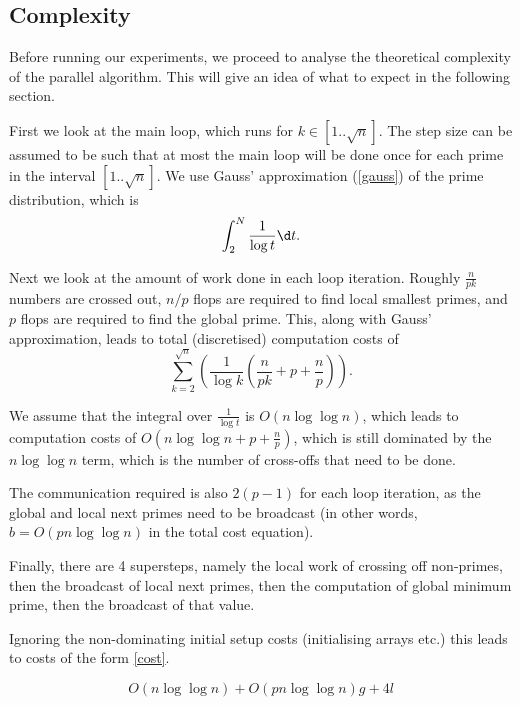 \documentclass[a4paper]{article}
\begin{document}
\subsection{Complexity}

Before running our experiments, we proceed to analyse the theoretical complexity of the parallel algorithm. 
This will give an idea of what to expect in the following section.

First we look at the main loop, which runs for $k \in [1 .. \sqrt n]$. The step
size can be assumed to be such that at most the main loop will be done once for each prime
in the interval $[1 .. \sqrt n]$. We use Gauss' approximation (\ref{gauss}) of the prime distribution, which is 
\begin{eqnarray}
    \int_2^N \frac{1}{\log t} \d t.
    \label{gauss}
\end{eqnarray}

Next we look at the amount of work done in each loop iteration. Roughly $\frac{n}{p k}$ numbers are crossed out, 
$n/p$ flops are required to find local smallest primes, and $p$ flops are required to find the global prime.
This, along with Gauss' approximation, leads to total (discretised) computation costs of 
\begin{equation}
    \sum_{k=2}^{\sqrt n} \left( \frac{1}{\log k} \left( \frac{n}{p k} + p + \frac{n}{p}\right) \right) .
\end{equation}

We assume that the integral over $\frac{1}{\log t}$ is $O(n \log \log n)$, which leads to computation costs
of $O( n \log \log n +p + \frac{n}{p})$, which is still dominated by the $n \log \log n$ term, which is the number 
of cross-offs that need to be done. 

The communication required is also $2(p-1)$ for each loop iteration, as the global and local 
next primes need to be broadcast (in other words, $b = O(p n \log \log n)$ in the total cost equation). 

Finally, there are 4 supersteps, namely the local work of crossing off non-primes, then the broadcast
of local next primes, then the computation of global minimum prime, then the broadcast of that value. 

Ignoring the non-dominating initial setup costs (initialising arrays etc.) this leads to costs of the 
form \ref{cost}.

\begin{equation}
    O(n \log\log n) + O(p n \log \log n)g + 4l
    \label{cost}
\end{equation}
\end{document}
